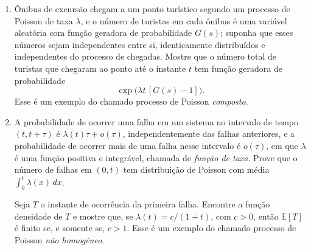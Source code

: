 \documentclass[12pt,portuguese]{article}
\theoremstyle{definition}
\theoremstyle{plainexercise}
\theoremstyle{starredexercise}
\theoremstyle{definition}
\begin{document}
\begin{enumerate}[label={\arabic*.}]
\item\label{prob:poisson-composto}
Ônibus de excursão chegam a um ponto turístico segundo um processo de Poisson
de taxa $\lambda$, e o número de turistas em cada ônibus é uma variável
aleatória com função geradora de probabilidade $G(s)$; suponha que esses
números sejam independentes entre si, identicamente distribuídos e
independentes do processo de chegadas. Mostre que o número total de turistas
que chegaram ao ponto até o instante $t$ tem função geradora de probabilidade
\[
  \exp\bigl(\lambda t\,[G(s)-1]\bigr).
\]
Esse é um exemplo do chamado processo de Poisson \emph{composto}.

\item\label{prob:poisson-nao-homogeneo}
A probabilidade de ocorrer uma falha em um sistema no intervalo de tempo
$(t,t+\tau)$ é $\lambda(t)\tau+o(\tau)$, independentemente das falhas
anteriores, e a probabilidade de ocorrer mais de uma falha nesse intervalo é
$o(\tau)$, em que $\lambda$ é uma função positiva e integrável, chamada de
\emph{função de taxa}. Prove que o número de falhas em $(0,t)$ tem
distribuição de Poisson com média $\int_0^t\lambda(x)\,dx$.

Seja $T$ o instante de ocorrência da primeira falha. Encontre a função
densidade de $T$ e mostre que, se $\lambda(t)=c/(1+t)$, com $c>0$, então
$\mathbb{E}[T]$ é finito se, e somente se, $c>1$. Esse é um exemplo do chamado
processo de Poisson \emph{não homogêneo}.
\end{enumerate}



\end{document}
